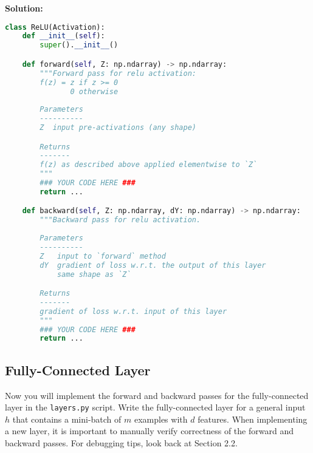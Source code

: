 \documentclass{article}
\newenvironment{solution}{\color{blue} \smallskip \textbf{Solution:}}{}
\begin{document}
\begin{solution}
    \begin{lstlisting}[language=Python]
class ReLU(Activation):
    def __init__(self):
        super().__init__()

    def forward(self, Z: np.ndarray) -> np.ndarray:
        """Forward pass for relu activation:
        f(z) = z if z >= 0
               0 otherwise
        
        Parameters
        ----------
        Z  input pre-activations (any shape)

        Returns
        -------
        f(z) as described above applied elementwise to `Z`
        """
        ### YOUR CODE HERE ###
        return ...

    def backward(self, Z: np.ndarray, dY: np.ndarray) -> np.ndarray:
        """Backward pass for relu activation.
        
        Parameters
        ----------
        Z   input to `forward` method
        dY  gradient of loss w.r.t. the output of this layer
            same shape as `Z`

        Returns
        -------
        gradient of loss w.r.t. input of this layer
        """
        ### YOUR CODE HERE ###
        return ...

	\end{lstlisting}

\end{solution}

\newpage
\subsection{Fully-Connected Layer}
Now you will implement the forward and backward passes for the fully-connected layer in the \texttt{layers.py} script. 
Write the fully-connected layer for a general input $h$ that contains a mini-batch of $m$ examples with $d$ features. 
When implementing a new layer, it is important to manually verify correctness of the forward and backward passes. For debugging tips, look back at Section 2.2.
\end{document}
